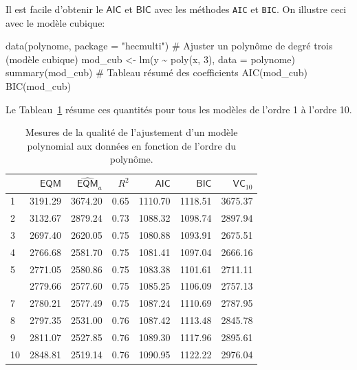 \documentclass[
  11pt,
  letterpaper,
]{scrbook}
\newenvironment{Shaded}{\begin{snugshade}}{\end{snugshade}}
\newcommand{\AttributeTok}[1]{\textcolor[rgb]{0.40,0.45,0.13}{#1}}
\newcommand{\CommentTok}[1]{\textcolor[rgb]{0.37,0.37,0.37}{#1}}
\newcommand{\DecValTok}[1]{\textcolor[rgb]{0.68,0.00,0.00}{#1}}
\newcommand{\FunctionTok}[1]{\textcolor[rgb]{0.28,0.35,0.67}{#1}}
\newcommand{\NormalTok}[1]{\textcolor[rgb]{0.00,0.23,0.31}{#1}}
\newcommand{\OtherTok}[1]{\textcolor[rgb]{0.00,0.23,0.31}{#1}}
\newcommand{\SpecialCharTok}[1]{\textcolor[rgb]{0.37,0.37,0.37}{#1}}
\newcommand{\StringTok}[1]{\textcolor[rgb]{0.13,0.47,0.30}{#1}}
\theoremstyle{definition}
\theoremstyle{remark}
\begin{document}
Il est facile d'obtenir le \(\mathsf{AIC}\) et \(\mathsf{BIC}\) avec les
méthodes \texttt{AIC} et \texttt{BIC}. On illustre ceci avec le modèle
cubique:

\begin{Shaded}
\begin{Highlighting}[]
\FunctionTok{data}\NormalTok{(polynome, }\AttributeTok{package =} \StringTok{"hecmulti"}\NormalTok{)}
\CommentTok{\# Ajuster un polynôme de degré trois (modèle cubique)}
\NormalTok{mod\_cub }\OtherTok{\textless{}{-}} \FunctionTok{lm}\NormalTok{(y }\SpecialCharTok{\textasciitilde{}} \FunctionTok{poly}\NormalTok{(x, }\DecValTok{3}\NormalTok{),}
              \AttributeTok{data =}\NormalTok{ polynome)}
\FunctionTok{summary}\NormalTok{(mod\_cub) }\CommentTok{\# Tableau résumé des coefficients}
\FunctionTok{AIC}\NormalTok{(mod\_cub)}
\FunctionTok{BIC}\NormalTok{(mod\_cub)}
\end{Highlighting}
\end{Shaded}

Le Tableau~\ref{tbl-polynome-ajustement} résume ces quantités pour tous
les modèles de l'ordre 1 à l'ordre 10.

\hypertarget{tbl-polynome-ajustement}{}
\begin{table}
\caption{\label{tbl-polynome-ajustement}Mesures de la qualité de l'ajustement d'un modèle polynomial aux données
en fonction de l'ordre du polynôme. }\tabularnewline

\centering
\begin{tabular}{lrrrrrr}
\toprule
  & \(\mathsf{EQM}\) & \(\widehat{\mathsf{EQM}}_a\) & \(R^2\) & \(\mathsf{AIC}\) & \(\mathsf{BIC}\) & \(\mathsf{VC}_{10}\)\\
\midrule
1 & 3191.29 & 3674.20 & 0.65 & 1110.70 & 1118.51 & 3675.37\\
2 & 3132.67 & 2879.24 & 0.73 & 1088.32 & 1098.74 & 2897.94\\
3 & 2697.40 & 2620.05 & 0.75 & 1080.88 & 1093.91 & 2675.51\\
4 & 2766.68 & 2581.70 & 0.75 & 1081.41 & 1097.04 & 2666.16\\
5 & 2771.05 & 2580.86 & 0.75 & 1083.38 & 1101.61 & 2711.11\\
\addlinespace
6 & 2779.66 & 2577.60 & 0.75 & 1085.25 & 1106.09 & 2757.13\\
7 & 2780.21 & 2577.49 & 0.75 & 1087.24 & 1110.69 & 2787.95\\
8 & 2797.35 & 2531.00 & 0.76 & 1087.42 & 1113.48 & 2845.78\\
9 & 2811.07 & 2527.85 & 0.76 & 1089.30 & 1117.96 & 2895.61\\
10 & 2848.81 & 2519.14 & 0.76 & 1090.95 & 1122.22 & 2976.04\\
\bottomrule
\end{tabular}
\end{table}
\end{document}

